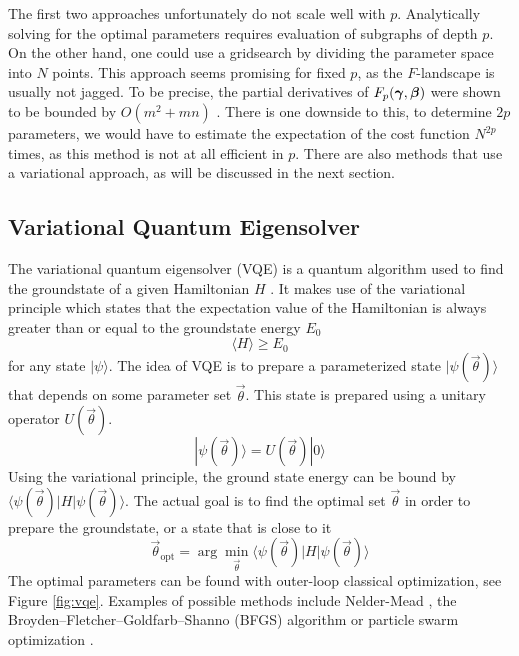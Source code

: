 The first two approaches unfortunately do not scale well with $p$. Analytically solving for the optimal parameters requires evaluation of subgraphs of depth $p$. On the other hand, one could use a gridsearch by dividing the parameter space into $N$ points. This approach seems promising for fixed $p$, as the $F$-landscape is usually not jagged. To be precise, the partial derivatives of $F_p(\bm{\gamma},\bm{\beta})$ were shown to be bounded by $O(m^2+mn)$ \cite{FGG14}. There is one downside to this, to determine $2p$ parameters, we would have to estimate the expectation of the cost function $N^{2p}$ times, as this method is not at all efficient in $p$. There are also methods that use a variational approach, as will be discussed in the next section.

\subsection{Variational Quantum Eigensolver}
\label{sec:vqe}
The variational quantum eigensolver (VQE) is a quantum algorithm used to find the groundstate of a given Hamiltonian $H$ \cite{VQE, MRBA16}. It makes use of the variational principle which states that the expectation value of the Hamiltonian is always greater than or equal to the groundstate energy $E_0$  \cite{Griffiths}
\begin{equation}
\langle H \rangle \geq E_0
\end{equation}
for any state $|\psi\rangle$. The idea of VQE is to prepare a parameterized state $|\psi  (\vec{\theta}) \rangle$ that depends on some parameter set $\vec{\theta}$. This state is prepared using a unitary operator $U(\vec{\theta})$.
\begin{equation}
|\psi (\vec{\theta}) \rangle = U(\vec{\theta})|0\rangle
\label{eq:vqe-parametrized-unitary}
\end{equation} 
Using the variational principle, the ground state energy can be bound by $\langle \psi(\vec{\theta})|H|\psi(\vec{\theta})\rangle$. The actual goal is to find the optimal set $\vec{\theta}$ in order to prepare the groundstate, or a state that is close to it
\begin{equation}
\vec{\theta}_{\text{opt}} = \arg \min_{\vec{\theta}} \langle \psi(\vec{\theta})|H|\psi(\vec{\theta})\rangle
\end{equation}
The optimal parameters can be found with outer-loop classical optimization, see Figure \ref{fig:vqe}. Examples of possible methods include Nelder-Mead \cite{NelderMead}, the Broyden–Fletcher–Goldfarb–Shanno (BFGS) algorithm \cite{BFGS} or particle swarm optimization \cite{PSO1, PSO2}.


